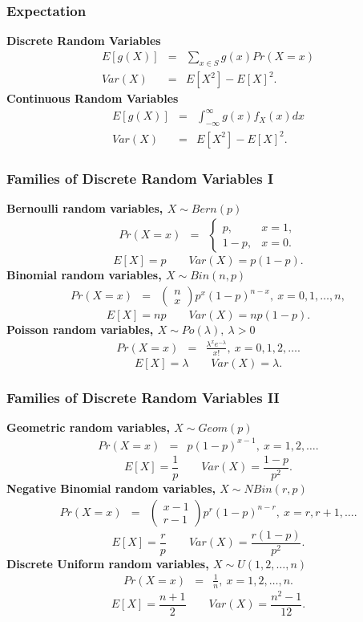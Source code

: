 \documentclass[serif,10pt,compress]{beamer}
\begin{document}
\begin{frame}[t]
	\frametitle{Expectation}
{\bf Discrete Random Variables}
\begin{eqnarray*}
E[g(X)] &=& \sum_{x \in S} g(x) Pr(X=x) \\
Var(X)  &=& E[X^2] - E[X]^2.
\end{eqnarray*}
{\bf Continuous Random Variables}
\begin{eqnarray*}
E[g(X)] &=&  \int_{-\infty}^{\infty} g(x) f_X(x) dx \\
Var(X)  &=& E[X^2]-E[X]^2.
\end{eqnarray*}
\end{frame}

\begin{frame}[t]
\frametitle{Families of Discrete Random Variables I}
{\bf Bernoulli random variables, $X \sim Bern(p)$}
\begin{eqnarray*}
Pr(X=x) &=& \left\{ \begin{array}{cc} p, & x=1, \\ 1-p, & x=0. \end{array} \right.
\end{eqnarray*}
\[
E[X] = p \qquad Var(X) = p(1-p).
\]
{\bf Binomial random variables, $X \sim Bin(n,p)$} 
\begin{eqnarray*}
Pr(X=x) &=& \left( \begin{array}{c} n \\ x
      \end{array} \right) p^x (1-p)^{n-x},\  x=0,1,\ldots,n,
\end{eqnarray*}
\[
E[X] = np \qquad Var(X) = np(1-p).
\]
{\bf Poisson random variables, $X \sim Po(\lambda), \ \lambda>0$}
\begin{eqnarray*}
Pr(X=x) &=& \frac{\lambda^x e^{-\lambda}}{x!}, \ x=0,1,2,\ldots.
\end{eqnarray*}
\[
E[X] = \lambda \qquad Var(X) = \lambda.
\]
\end{frame}

\begin{frame}[t]
\frametitle{Families of Discrete Random Variables II}

{\bf Geometric random variables, $X \sim Geom(p)$}
\begin{eqnarray*}
Pr(X=x) &=& p(1-p)^{x-1}, \ x=1,2,\ldots.
\end{eqnarray*}
\[
E[X] = \frac{1}{p} \qquad Var(X) = \frac{1-p}{p^2}.
\]
{\bf Negative Binomial random variables, $X \sim NBin(r,p)$} 
\begin{eqnarray*}
Pr(X=x) &=& \left( \begin{array}{cc} x-1 \\ r-1 \end{array} \right) p^r (1-p)^{n-r}, \ x=r,r+1,\ldots.
\end{eqnarray*}
\[
E[X] = \frac{r}{p} \qquad Var(X) = \frac{r(1-p)}{p^2}. 
\]
{\bf Discrete Uniform random variables, $X \sim U(1,2,\ldots,n)$}
\begin{eqnarray*}
Pr(X=x) &=& \frac{1}{n}, \ x=1,2,\ldots,n.
\end{eqnarray*}
\[
E[X] = \frac{n+1}{2} \qquad Var(X) = \frac{n^2-1}{12}.
\]
\end{frame}
\end{document}
